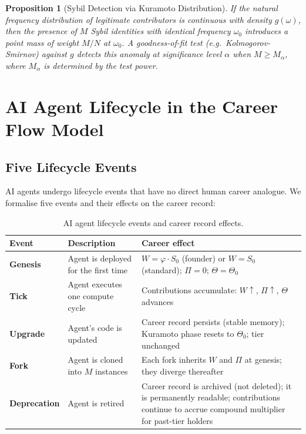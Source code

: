 \documentclass[12pt]{article}
\newtheorem{proposition}[theorem]{Proposition}
\newcommand{\PHI}{\varphi}
\begin{document}
\begin{proposition}[Sybil Detection via Kuramoto Distribution]
  If the natural frequency distribution of legitimate contributors is continuous
  with density $g(\omega)$, then the presence of $M$ Sybil identities with
  identical frequency $\omega_0$ introduces a point mass of weight $M/N$ at
  $\omega_0$.  A goodness-of-fit test (e.g.\ Kolmogorov-Smirnov) against $g$
  detects this anomaly at significance level $\alpha$ when $M \ge M_\alpha$,
  where $M_\alpha$ is determined by the test power.
\end{proposition}

\section{AI Agent Lifecycle in the Career Flow Model}
\label{sec:lifecycle}

\subsection{Five Lifecycle Events}

AI agents undergo lifecycle events that have no direct human career analogue.
We formalise five events and their effects on the career record:

\begin{table}[h]
  \centering
  \caption{AI agent lifecycle events and career record effects.}
  \label{tab:lifecycle}
  \begin{tabular}{lp{4.5cm}p{5cm}}
    \toprule
    Event & Description & Career effect \\
    \midrule
    \textbf{Genesis}     & Agent is deployed for the first time & $W = \PHI \cdot S_0$ (founder) or $W = S_0$ (standard); $\Pi = 0$; $\Theta = \Theta_0$ \\
    \textbf{Tick}        & Agent executes one compute cycle  & Contributions accumulate: $W \uparrow$, $\Pi \uparrow$, $\Theta$ advances \\
    \textbf{Upgrade}     & Agent's code is updated           & Career record persists (stable memory); Kuramoto phase resets to $\Theta_0$; tier unchanged \\
    \textbf{Fork}        & Agent is cloned into $M$ instances & Each fork inherits $W$ and $\Pi$ at genesis; they diverge thereafter \\
    \textbf{Deprecation} & Agent is retired                  & Career record is archived (not deleted); it is permanently readable; contributions continue to accrue compound multiplier for past-tier holders \\
    \bottomrule
  \end{tabular}
\end{table}
\end{document}
